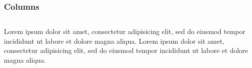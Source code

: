 \label{columns}
\begin{frame}\frametitle{Columns}
  \begin{columns}
      Lorem ipsum dolor sit amet, consectetur adipisicing elit, sed do eiusmod tempor incididunt ut labore et dolore magna aliqua.
      Lorem ipsum dolor sit amet, consectetur adipisicing elit, sed do eiusmod tempor incididunt ut labore et dolore magna aliqua.
  \end{columns}
\end{frame}